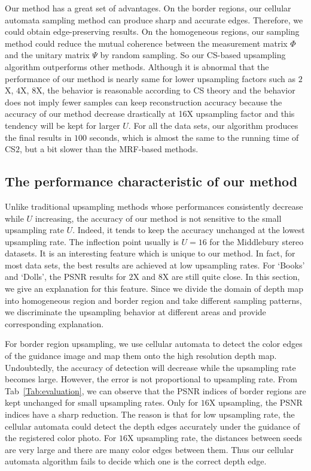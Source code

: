 \documentclass[preprint,10pt,5p,times,twocolumn]{elsarticle}
\begin{document}
Our method has a great set of advantages. On the border regions, our cellular automata sampling method can produce sharp and accurate edges. Therefore, we could obtain edge-preserving results. On the homogeneous regions, our sampling method could reduce the mutual coherence between the measurement matrix $\Phi$ and the unitary matrix $\Psi$ by random sampling. So our CS-based upsampling algorithm outperforms other methods. Although it is abnormal that the performance of our method is nearly same for lower upsampling factors such as $2$X, $4$X, $8$X, the behavior is reasonable according to CS theory and the behavior does not imply fewer samples can keep reconstruction accuracy because the accuracy of our method decrease drastically at 16X upsampling factor and this tendency will be kept for larger $U$. For all the data sets, our algorithm produces the final results in $100$ seconds, which is almost the same to the running time of CS$2$, but a bit slower than the MRF-based methods.

\subsection{The performance characteristic of our method}


Unlike traditional upsampling methods whose performances consistently decrease while $U$ increasing, the accuracy of our method is not sensitive to the small upsampling rate $U$. Indeed, it tends to keep the accuracy unchanged at the lowest upsampling rate. The inflection point usually is $U = 16$ for the Middlebury stereo datasets. It is an interesting feature which is unique to our method. In fact, for most data sets, the best results are achieved at low upsampling rates. For `Books' and `Dolls', the PSNR results for $2$X and $8$X are still quite close. In this section, we give an explanation for this feature. Since we divide the domain of depth map into homogeneous region and border region and take different sampling patterns, we discriminate the upsampling behavior at different areas and provide corresponding explanation.


For border region upsampling, we use cellular automata to detect the color edges of the guidance image and map them onto the high resolution depth map. Undoubtedly, the accuracy of detection will decrease while the upsampling rate becomes large. However, the error is not proportional to upsampling rate. From  Tab~\ref{Tab:evaluation}, we can observe that the PSNR indices of border regions are kept unchanged for small upsampling rates. Only for $16$X upsampling, the PSNR indices have a sharp reduction. The reason is that for low upsampling rate, the cellular automata could detect the depth edges accurately under the guidance of the registered color photo. For $16$X upsampling rate, the distances between seeds are very large and there are many color edges between them. Thus our cellular automata algorithm fails to decide which one is the correct depth edge.
\end{document}

